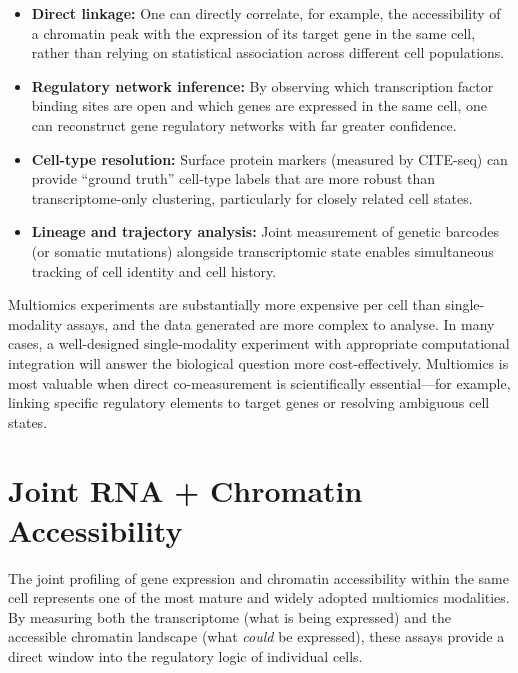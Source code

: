 \begin{itemize}[itemsep=3pt]
  \item \textbf{Direct linkage:} One can directly correlate, for example, the accessibility of a chromatin peak with the expression of its target gene in the same cell, rather than relying on statistical association across different cell populations.
  \item \textbf{Regulatory network inference:} By observing which transcription factor binding sites are open and which genes are expressed in the same cell, one can reconstruct gene regulatory networks with far greater confidence.
  \item \textbf{Cell-type resolution:} Surface protein markers (measured by CITE-seq) can provide ``ground truth'' cell-type labels that are more robust than transcriptome-only clustering, particularly for closely related cell states.
  \item \textbf{Lineage and trajectory analysis:} Joint measurement of genetic barcodes (or somatic mutations) alongside transcriptomic state enables simultaneous tracking of cell identity and cell history.
\end{itemize}

\begin{warningbox}
Multiomics experiments are substantially more expensive per cell than single-modality assays, and the data generated are more complex to analyse. In many cases, a well-designed single-modality experiment with appropriate computational integration will answer the biological question more cost-effectively. Multiomics is most valuable when direct co-measurement is scientifically essential---for example, linking specific regulatory elements to target genes or resolving ambiguous cell states.
\end{warningbox}


\section{Joint RNA + Chromatin Accessibility}
\label{sec:multiomics:rna-atac}

The joint profiling of gene expression and chromatin accessibility within the same cell represents one of the most mature and widely adopted multiomics modalities. By measuring both the transcriptome (what is being expressed) and the accessible chromatin landscape (what \textit{could} be expressed), these assays provide a direct window into the regulatory logic of individual cells.

